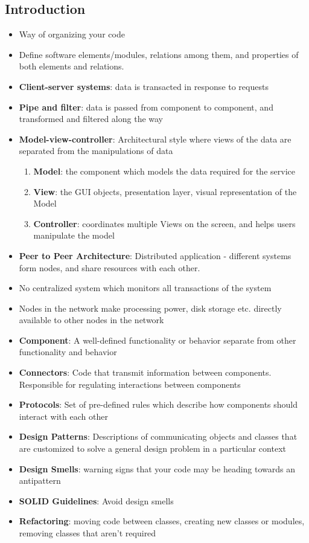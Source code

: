 \documentclass[a4paper]{article}
\begin{document}
\subsection{Introduction}
\begin{itemize}
    \item Way of organizing your code
    \item Define software elements/modules, relations among them, and properties of both elements and relations.
    \item \textbf{Client-server systems}: data is transacted in response to requests
    \item \textbf{Pipe and filter}: data is passed from component to component, and transformed and filtered along the way
    \item \textbf{Model-view-controller}: Architectural style where views of the data are separated from the manipulations of data
    \begin{enumerate}
        \item \textbf{Model}: the component which models the data required for the service
        \item \textbf{View}: the GUI objects, presentation layer, visual representation of the Model
        \item \textbf{Controller}: coordinates multiple Views on the screen, and helps users manipulate the model
    \end{enumerate}
    \item \textbf{Peer to Peer Architecture}: Distributed application - different systems form nodes, and share resources with each other. 
    \item No centralized system which monitors all transactions of the system
    \item Nodes in the network make processing power, disk storage etc. directly available to other nodes in the network
    \item \textbf{Component}: A well-defined functionality or behavior separate from other functionality and behavior
    \item \textbf{Connectors}: Code that transmit information between components. Responsible for regulating interactions between components
    \item \textbf{Protocols}: Set of pre-defined rules which describe how components should interact with each other
    \item \textbf{Design Patterns}: Descriptions of communicating objects and classes that are customized to solve a general design problem in a particular context
    \item \textbf{Design Smells}: warning signs that your code may be heading towards an antipattern
    \item \textbf{SOLID Guidelines}: Avoid design smells
    \item \textbf{Refactoring}: moving code between classes, creating new classes or modules, removing classes that aren’t required
\end{itemize}
\end{document}
